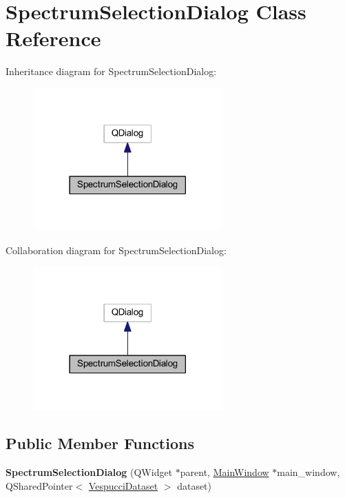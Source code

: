 \hypertarget{class_spectrum_selection_dialog}{\section{Spectrum\+Selection\+Dialog Class Reference}
\label{class_spectrum_selection_dialog}
}


Inheritance diagram for Spectrum\+Selection\+Dialog\+:\nopagebreak
\begin{figure}[H]
\begin{center}
\leavevmode
\includegraphics[width=206pt]{class_spectrum_selection_dialog__inherit__graph}
\end{center}
\end{figure}


Collaboration diagram for Spectrum\+Selection\+Dialog\+:\nopagebreak
\begin{figure}[H]
\begin{center}
\leavevmode
\includegraphics[width=206pt]{class_spectrum_selection_dialog__coll__graph}
\end{center}
\end{figure}
\subsection*{Public Member Functions}
\begin{DoxyCompactItemize}
\item 
\hypertarget{class_spectrum_selection_dialog_acadf8b1cccdd26dea5a01682e95f2ca7}{{\bfseries Spectrum\+Selection\+Dialog} (Q\+Widget $\ast$parent, \hyperlink{class_main_window}{Main\+Window} $\ast$main\+\_\+window, Q\+Shared\+Pointer$<$ \hyperlink{class_vespucci_dataset}{Vespucci\+Dataset} $>$ dataset)}\label{class_spectrum_selection_dialog_acadf8b1cccdd26dea5a01682e95f2ca7}

\end{DoxyCompactItemize}


